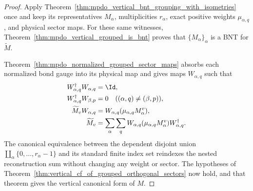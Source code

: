 \begin{proof}
    \leanok
    Apply
    Theorem~\ref{thm:mpdo_vertical_bnt_grouping_with_isometries} once and keep
    its representatives $M_\alpha$, multiplicities $r_\alpha$, exact
    positive weights $\mu_{\alpha,q}$, and physical sector maps. For these
    same witnesses,
    Theorem~\ref{thm:mpdo_vertical_grouped_is_bnt} proves that
    $\{M_\alpha\}_\alpha$ is a BNT for $\widetilde M$.

    Theorem~\ref{thm:mpdo_normalized_grouped_sector_maps} absorbs each
    normalized bond gauge into its physical map and gives maps
    $W_{\alpha,q}$ such that
    \begin{align}
        W_{\alpha,q}^\dagger W_{\alpha,q}&=\Id,
        \notag\\
        W_{\alpha,q}^\dagger W_{\beta,p}&=0
        \quad((\alpha,q)\ne(\beta,p)),
        \notag\\
        \widetilde M_vW_{\alpha,q}
        &=W_{\alpha,q}(\mu_{\alpha,q}M_\alpha^v),
        \notag\\
        \widetilde M_v
        &=\sum_\alpha\sum_q
          W_{\alpha,q}(\mu_{\alpha,q}M_\alpha^v)
          W_{\alpha,q}^\dagger.
        \notag
    \end{align}
    The canonical equivalence between the dependent disjoint union
    $\coprod_\alpha\{0,\ldots,r_\alpha-1\}$ and its standard finite index
    set reindexes the nested reconstruction sum without changing any weight
    or sector. The hypotheses of
    Theorem~\ref{thm:vertical_cf_of_grouped_orthogonal_sectors} now hold, and
    that theorem gives the vertical canonical form of $M$.
\end{proof}
